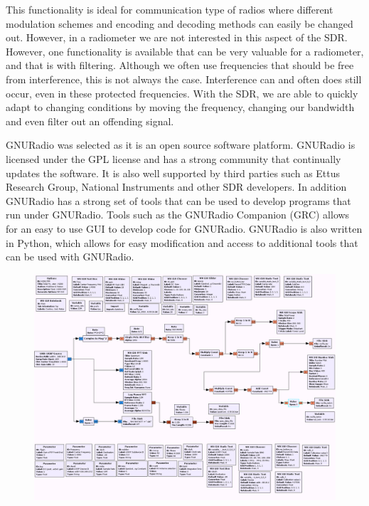 This functionality is ideal for communication type of radios where different modulation schemes and encoding and decoding methods can easily be changed out.  However, in a radiometer we are not interested in this aspect of the SDR.  However, one functionality is available that can be very valuable for a radiometer, and that is with filtering.  Although we often use frequencies that should be free from interference, this is not always the case.  Interference can and often does still occur, even in these protected frequencies.  With the SDR, we are able to quickly adapt to changing conditions by moving the frequency, changing our bandwidth and even filter out an offending signal.  

GNURadio was selected as it is an open source software platform.  GNURadio is licensed under the GPL license and has a strong community that continually updates the software.  It is also well supported by third parties such as Ettus Research Group, National Instruments and other SDR developers.  In addition GNURadio has a strong set of tools that can be used to develop programs that run under GNURadio.  Tools such as the GNURadio Companion (GRC) allows for an easy to use GUI to develop code for GNURadio.  GNURadio is also written in Python, which allows for easy modification and access to additional tools that can be used with GNURadio.  

{\begin{figure}[h!tb] 
\centering
\includegraphics[width=17cm]{Images/N200_radiometer_grc.png}
\label{N200_GRC}
\end{figure}
}

